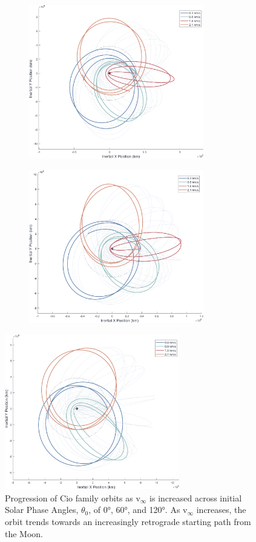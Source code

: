 \documentclass[letterpaper, paper,11pt]{AAS}	%
\begin{document}
\begin{figure}[h!]
    \begin{subfigure}{}
        \includegraphics[trim=75 50 0 0, clip, width=3in]{./figs/mooni_vInfPlot_io_famC_theta0.png}
    \end{subfigure}
    \begin{subfigure}{}
        \includegraphics[trim=75 50 0 0, clip, width=3in]{./figs/mooni_vInfPlot_io_famC_theta60.png}
    \end{subfigure}
\end{figure}
\begin{figure}[h]
    \centering
    \includegraphics[trim=75 50 0 0, clip, width=3in]{./figs/mooni_vInfPlot_io_famC_theta120.png}
    \caption{Progression of Cio family orbits as v\(_\infty\) is increased across initial Solar Phase Angles, \(\theta_0\), of 0°, 60°, and 120°. As v\(_\infty\) increases, the orbit trends towards an increasingly retrograde starting path from the Moon.}
    \label{fig:mooni_vinfPlot_io_C}
\end{figure}
\end{document}
